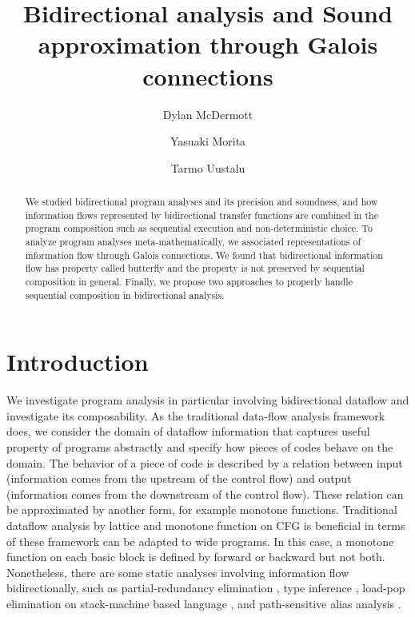 \documentclass{easychair}
\title{Bidirectional analysis and Sound approximation through Galois connections}
\author{
  Dylan McDermott \inst{1}
\and
  Yasuaki Morita  \inst{1}
\and
  Tarmo Uustalu   \inst{1}
}
\institute{
  Reykjavik University,
  Reykjav{\'i}k, Iceland\\
  \email{dylanm@ru.is}, \email{yasuaki20@ru.is}, \email{tarmo@ru.is}
}
\theoremstyle{definition}
\begin{document}
\maketitle

\begin{abstract}
  We studied bidirectional program analyses and its precision and soundness, and how information flows represented by bidirectional transfer functions are combined in the program composition such as sequential execution and non-deterministic choice. To analyze program analyses meta-mathematically, we associated representations of information flow through Galois connections. We found that bidirectional information flow has property called butterfly and the property is not preserved by sequential composition in general. Finally, we propose two approaches to properly handle sequential composition in bidirectional analysis.
\end{abstract}

\section{Introduction}

We investigate program analysis in particular involving bidirectional dataflow and investigate its composability.
As the traditional data-flow analysis framework does, we consider the domain of dataflow information that captures useful property of programs abstractly and specify how pieces of codes behave on the domain.
The behavior of a piece of code is described by a relation between input (information comes from the upstream of the control flow) and output (information comes from the downstream of the control flow).
These relation can be approximated by another form, for example monotone functions.
Traditional dataflow analysis by lattice and monotone function on CFG is beneficial in terms of these framework can be adapted to wide programs.
In this case, a monotone function on each basic block is defined by forward or backward but not both.
Nonetheless, there are some static analyses involving information flow bidirectionally, such as partial-redundancy elimination \cite{khedker_bidirectional_1999}, type inference \cite{DBLP:journals/cl/KhedkerDM03}, load-pop elimination on stack-machine based language \cite{frade_bidirectional_2009}, and path-sensitive alias analysis \cite{jaiswal_bidirectionality_2020}.
\end{document}
